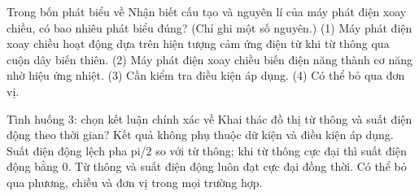\begin{ex}
Trong bốn phát biểu về Nhận biết cấu tạo và nguyên lí của máy phát điện xoay chiều, có bao nhiêu phát biểu đúng? (Chỉ ghi một số nguyên.) (1) Máy phát điện xoay chiều hoạt động dựa trên hiện tượng cảm ứng điện từ khi từ thông qua cuộn dây biến thiên. (2) Máy phát điện xoay chiều biến điện năng thành cơ năng nhờ hiệu ứng nhiệt. (3) Cần kiểm tra điều kiện áp dụng. (4) Có thể bỏ qua đơn vị.
\end{ex}

\begin{ex}
Tình huống 3: chọn kết luận chính xác về Khai thác đồ thị từ thông và suất điện động theo thời gian?
\choice
{Kết quả không phụ thuộc dữ kiện và điều kiện áp dụng.}
{\True Suất điện động lệch pha pi/2 so với từ thông; khi từ thông cực đại thì suất điện động bằng 0.}
{Từ thông và suất điện động luôn đạt cực đại đồng thời.}
{Có thể bỏ qua phương, chiều và đơn vị trong mọi trường hợp.}
\end{ex}

